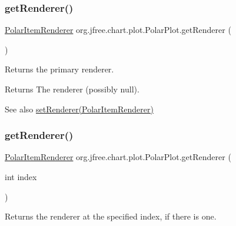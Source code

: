 \subsubsection{\texorpdfstring{get\+Renderer()}{getRenderer()}\hspace{0.1cm}{\footnotesize\ttfamily [1/2]}}
{\footnotesize\ttfamily \mbox{\hyperlink{interfaceorg_1_1jfree_1_1chart_1_1renderer_1_1_polar_item_renderer}{Polar\+Item\+Renderer}} org.\+jfree.\+chart.\+plot.\+Polar\+Plot.\+get\+Renderer (\begin{DoxyParamCaption}{ }\end{DoxyParamCaption})}

Returns the primary renderer.

\begin{DoxyReturn}{Returns}
The renderer (possibly {\ttfamily null}).
\end{DoxyReturn}
\begin{DoxySeeAlso}{See also}
\mbox{\hyperlink{classorg_1_1jfree_1_1chart_1_1plot_1_1_polar_plot_a0f5968ac9a7b8c8bff650d6e50881135}{set\+Renderer(\+Polar\+Item\+Renderer)}} 
\end{DoxySeeAlso}
\mbox{\label{classorg_1_1jfree_1_1chart_1_1plot_1_1_polar_plot_afad236333ed9dff60408dc1827779646}} 
\subsubsection{\texorpdfstring{get\+Renderer()}{getRenderer()}\hspace{0.1cm}{\footnotesize\ttfamily [2/2]}}
{\footnotesize\ttfamily \mbox{\hyperlink{interfaceorg_1_1jfree_1_1chart_1_1renderer_1_1_polar_item_renderer}{Polar\+Item\+Renderer}} org.\+jfree.\+chart.\+plot.\+Polar\+Plot.\+get\+Renderer (\begin{DoxyParamCaption}\item[{int}]{index }\end{DoxyParamCaption})}

Returns the renderer at the specified index, if there is one.


